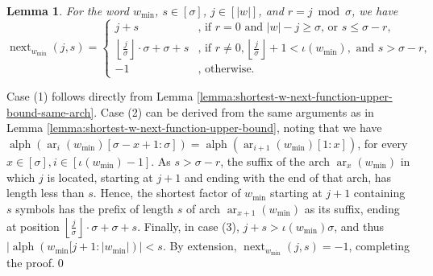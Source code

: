 \documentclass[10pt,a4paper]{amsart}
\makeatletter
\DeclareMathOperator{\arch}{ar}
\DeclareMathOperator{\alphabet}{alph}
\DeclareMathOperator{\nextAlphPos}{next}
\newif\ifpaper
\theoremstyle{plain}
\newtheorem{lemma}{Lemma}
\theoremstyle{definition}
\renewenvironment{proof}[1][\proofname]{\par
  \pushQED{}%
  \normalfont \topsep6\p@\@plus6\p@\relax
  \trivlist
  \item[\hskip\labelsep\itshape #1\@addpunct{.}]\ignorespaces
}{%
  \popQED\endtrivlist\@endpefalse
}
\makeatother
\begin{document}
\begin{lemma}\label{lemma:next-function-min-word-properties}
    For the word $w_{\min}$, $s\in[\sigma]$, $j\in[|w|]$, and $r = j\bmod\sigma$, we have
    $$ \nextAlphPos_{w_{\min}}(j, s) = 
    \begin{cases}  
        j+s     & \text{, if } r = 0\text{ and } |w|-j \geq \sigma \text{, or } s \leq \sigma-r, \\
        \left\lfloor\frac{j}{\sigma}\right\rfloor\cdot\sigma + \sigma + s    & \text{, if } r \neq 0, \left\lfloor\frac{j}{\sigma}\right\rfloor+1 < \iota(w_{\min}), \text{ and } s > \sigma-r,\\
        -1 & \text{, otherwise.}
    \end{cases}$$
\end{lemma}
\ifpaper
\else
\begin{proof}
	Case (1) follows directly from Lemma \ref{lemma:shortest-w-next-function-upper-bound-same-arch}.
	Case (2) can be derived from the same arguments as in Lemma \ref{lemma:shortest-w-next-function-upper-bound},  noting that we have $\alphabet(\arch_i(w_{\min})[\sigma - x + 1: \sigma]) = \alphabet(\arch_{i + 1}(w_{\min})[1 : x])$, for every $x \in [\sigma], i \in [\iota(w_{\min})-1]$. As $s > \sigma-r$, the suffix of the arch $\arch_{x}(w_{\min})$ in which $j$ is located, starting at $j+1$ and ending with the end of that arch, has length less than $s$. Hence, the shortest factor of $w_{\min}$ starting at $j + 1$ containing $s$ symbols has the prefix of length $s$ of arch $\arch_{x + 1}(w_{\min})$ as its suffix, ending at position $\left\lfloor\frac{j}{\sigma}\right\rfloor\cdot\sigma + \sigma + s$. Finally, in case (3), $j + s > \iota(w_{\min}) \sigma$, and thus $\vert \alphabet(w_{\min}[j + 1 : \vert w_{\min} \vert) \vert < s$. By extension, $\nextAlphPos_{w_{\min}}(j, s) = -1$, completing the proof.\qed
\end{proof}
\fi
\end{document}
